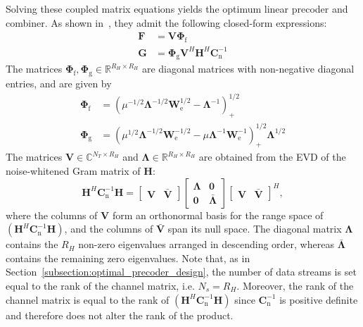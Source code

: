 Solving these coupled matrix equations yields the optimum linear precoder and combiner.
As shown in~\cite{su_mimo_joint_precoder_decoder_design}, they admit the following closed-form expressions:
\begin{subequations}
\label{eq:solution_generalized_design}
\begin{align}
    \mathbf{F} &= \mathbf{V} \mathbf{\Phi}_{\mathrm{f}} \label{eq:solution_generalized_design_precoder}\\
    \mathbf{G} &= \mathbf{\Phi}_{\mathrm{g}} \mathbf{V}^H \mathbf{H}^H \mathbf{C}^{-1}_{\mathrm{n}} \label{eq:solution_generalized_design_combiner}
\end{align}
\end{subequations}
The matrices $\mathbf{\Phi}_{\mathrm{f}}, \mathbf{\Phi}_{\mathrm{g}} \in \mathbb{R}^{R_H \times R_H}$ are diagonal matrices with non-negative diagonal entries, and are given by
\begin{subequations}
\label{eq:solution_generalized_design_phi}
\begin{align}
    \mathbf{\Phi}_{\mathrm{f}} &= (\mu^{-1/2} \mathbf{\Lambda}^{-1/2} \mathbf{W}^{1/2}_{\mathrm{e}} - \mathbf{\Lambda}^{-1})^{1/2}_{+} \label{eq:solution_generalized_design_precoder_phi}\\
    \mathbf{\Phi}_{\mathrm{g}} &= (\mu^{1/2} \mathbf{\Lambda}^{-1/2} \mathbf{W}^{-1/2}_{\mathrm{e}} - \mu \mathbf{\Lambda}^{-1} \mathbf{W}^{-1}_{\mathrm{e}})^{1/2}_{+} \mathbf{\Lambda}^{1/2} \label{eq:solution_generalized_design_combiner_phi}
\end{align}
\end{subequations}
The matrices $\mathbf{V} \in \mathbb{C}^{N_T \times R_H}$ and $\mathbf{\Lambda} \in \mathbb{R}^{R_H \times R_H}$ are obtained from the \ac{EVD} of the noise-whitened Gram matrix of $\mathbf{H}$:
\begin{equation}
\label{eq:evd_generalized_design}
    \mathbf{H}^H \mathbf{C}^{-1}_{\mathrm{n}} \mathbf{H} = \begin{bmatrix} \mathbf{V} & \bar{\mathbf{V}} \end{bmatrix} \begin{bmatrix} \mathbf{\Lambda} & \mathbf{0} \\ \mathbf{0} & \bar{\mathbf{\Lambda}} \end{bmatrix} \begin{bmatrix} \mathbf{V} & \bar{\mathbf{V}} \end{bmatrix}^H,
\end{equation}
where the columns of $\mathbf{V}$ form an orthonormal basis for the range space of $(\mathbf{H}^H \mathbf{C}_{\mathrm{n}}^{-1} \mathbf{H})$, and the columns of $\bar{\mathbf{V}}$ span its null space.
The diagonal matrix $\mathbf{\Lambda}$ contains the $R_H$ non-zero eigenvalues arranged in descending order, whereas $\bar{\mathbf{\Lambda}}$ contains the remaining zero eigenvalues.
Note that, as in Section~\ref{subsection:optimal_precoder_design}, the number of data streams is set equal to the rank of the channel matrix, i.e. $N_s = R_H$. Moreover, the rank of the channel matrix is equal to the rank of $(\mathbf{H}^H \mathbf{C}_{\mathrm{n}}^{-1} \mathbf{H})$ since $\mathbf{C}_{\mathrm{n}}^{-1}$ is positive definite and therefore does not alter the rank of the product.

